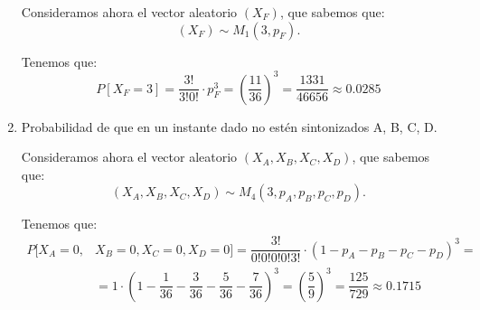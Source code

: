 \begin{ejercicio}
\begin{enumerate}
        Consideramos ahora el vector aleatorio $(X_F)$, que sabemos que:
        \begin{equation*}
            (X_F) \sim M_1\left(3,p_F\right).
        \end{equation*}

        Tenemos que:
        \begin{equation*}
            P[X_F = 3] = \dfrac{3!}{3!0!}\cdot p_F^3 = \left(\dfrac{11}{36}\right)^3 = \dfrac{1331}{46656} \approx 0.0285
        \end{equation*}

        \item Probabilidad de que en un instante dado no estén sintonizados A, B, C, D.
        
        Consideramos ahora el vector aleatorio $(X_A,X_B,X_C,X_D)$, que sabemos que:
        \begin{equation*}
            (X_A,X_B,X_C,X_D) \sim M_4\left(3,p_A,p_B,p_C,p_D\right).
        \end{equation*}

        Tenemos que:
        \begin{align*}
            P[X_A = 0,&X_B = 0,X_C = 0,X_D = 0] = \dfrac{3!}{0!0!0!0!3!}\cdot \left(1-p_A-p_B-p_C-p_D\right)^3 =\\&= 1\cdot \left(1-\dfrac{1}{36}-\dfrac{3}{36}-\dfrac{5}{36}-\dfrac{7}{36}\right)^3 = \left(\dfrac{5}{9}\right)^3 = \dfrac{125}{729} \approx 0.1715
        \end{align*}
    \end{enumerate}
\end{ejercicio}

